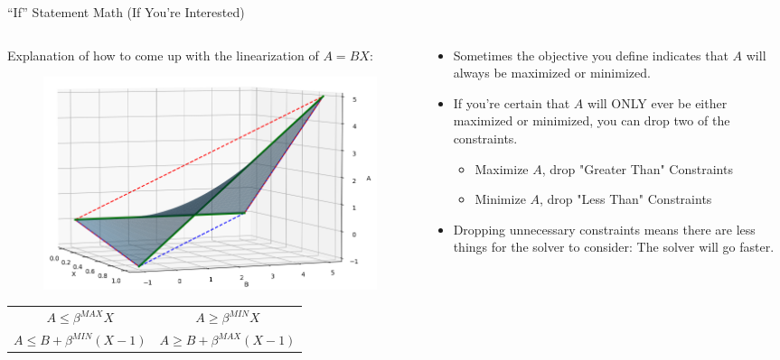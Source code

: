 \documentclass[10pt, aspectratio=169]{beamer}
\begin{document}
\begin{frame}{\enquote{If} Statement Math ({\small If You're Interested})}
    \begin{columns}
        \begin{column}{0.5\textwidth}
            \begin{center}
                Explanation of how to come up with the linearization of $A=BX$:
                \begin{figure}
                    \includegraphics[width=\linewidth]{DoubleSidedBigM.png}
                \end{figure}
            \end{center}
            \begin{tabular}{c c}
                $A \leq \beta^{MAX} X$ & $A \geq \beta^{MIN}X$ \\
                $A \leq B + \beta^{MIN}(X-1)$ & $A \geq B + \beta^{MAX}(X-1)$
            \end{tabular}
        \end{column}
        \begin{column}{0.5\textwidth}

            \begin{itemize}
                \item Sometimes the objective you define indicates that $A$ will always be maximized or minimized.
                \item If you're certain that $A$ will ONLY ever be either maximized or minimized, you can drop two of the constraints.
                \begin{itemize}
                    \item Maximize $A$, drop "Greater Than" Constraints
                    \item Minimize $A$, drop "Less Than" Constraints
                \end{itemize}
                \item Dropping unnecessary constraints means there are less things for the solver to consider: The solver will go faster.
            \end{itemize}
        \end{column}
    \end{columns}
\end{frame}
\end{document}
